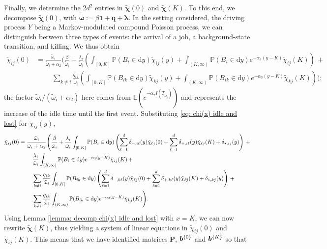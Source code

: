 \documentclass[reqno,12pt]{amsart}
\newcommand{\bs}{\boldsymbol}
\begin{document}
{Finally, we determine the $2d^2$ entries in $\tilde{\bs \chi}(0)$ and $\tilde{\bs \chi}(K)$. To this end, we decompose $\tilde{\bs \chi}(0)$, with $\tilde{\bs \omega} := \beta\bs{1} + \bs{q} + \bs{\lambda}$. 
In the setting considered, the driving process $Y$ being a Markov-modulated compound Poisson process, we can distinguish between three types of events: the arrival of a job,  a background-state transition, and killing. We thus obtain
\begin{align*}
    \tilde\chi_{ij}(0) &= \frac{\tilde\omega_i}{\tilde\omega_i+\alpha_2} \Bigg(\frac{\beta}{\tilde{\omega}_i}+\frac{\lambda_i}{\tilde{\omega}_i} \left(\int_{[0,K]}\mathbb{P}(B_i\in\mathrm{d}y)\tilde\chi_{ij}(y) + \int_{(K,\infty)}\mathbb{P}(B_i\in\mathrm{d}y)e^{-\alpha_3(y-K)}\tilde\chi_{ij}(K)\right)\,+\,\\
    &\:\:\:\:\:\:\quad\sum_{k\neq i}\frac{q_{ik}}{\tilde{\omega}_i} \left(\int_{[0,K]}\mathbb{P}(B_{ik}\in\mathrm{d}y)\tilde\chi_{kj}(y) + \int_{(K,\infty)}\mathbb{P}(B_{ik}\in\mathrm{d}y)e^{-\alpha_3(y-K)}\tilde\chi_{kj}(K)\right)\Bigg);
\end{align*}
the factor ${\tilde\omega_i}/({\tilde\omega_i+\alpha_2})$ here comes from $\mathbb{E}(e^{-\alpha_2 I(T_{\tilde\omega_i})})$ and represents the increase of the idle time until the first event.
Substituting \eqref{eq: chi(x) idle and lost} for $\tilde\chi_{ij}(y)$,
\begin{align}
    \tilde\chi_{ij}(0) &= \frac{\tilde\omega_i}{\tilde\omega_i+\alpha_2} \Bigg(\frac{\beta}{\tilde{\omega}_i}+\frac{\lambda_i}{\tilde{\omega}_i} \int_{[0,K]}\mathbb{P}(B_i\in\mathrm{d}y)\left(\sum_{\ell=1}^d\delta_{-, i\ell}(y)\tilde\chi_{\ell j}(0) + \sum_{\ell=1}^d\delta_{+, i\ell}(y)\tilde\chi_{\ell j}(K) + \delta_{\star,ij}(y)\right)\,+\,\notag\\ 
    &\quad\:\:\:\:\:\:\frac{\lambda_i}{\tilde{\omega}_i}  \int_{(K,\infty)}\mathbb{P}(B_i\in\mathrm{d}y)e^{-\alpha_3(y-K)}\tilde\chi_{ij}(K)\,+\,\notag\\
    &\quad\:\:\:\:\:\:\sum_{k\neq i}\frac{q_{ik}}{\tilde{\omega}_i} \int_{[0,K]}\mathbb{P}(B_{ik}\in\mathrm{d}y)\left(\sum_{\ell=1}^d\delta_{-, k\ell}(y)\tilde\chi_{\ell j}(0) + \sum_{\ell=1}^d\delta_{+, k\ell}(y)\tilde\chi_{\ell j}(K) + \delta_{\star,kj}(y)\right) \,+\,\notag\\
    &\quad\:\:\:\:\:\:\sum_{k\neq i}\frac{q_{ik}}{\tilde{\omega}_i} \int_{(K,\infty)}\mathbb{P}(B_{ik}\in\mathrm{d}y)e^{-\alpha_3(y-K)}\tilde\chi_{kj}(K)\Bigg).\notag
\end{align}
Using Lemma \ref{lemma: decomp chi(x) idle and lost} with $x=K$, we can now rewrite $\tilde{\bs \chi}(K)$, thus yielding a system of linear equations in $\tilde\chi_{ij}(0)$ and $\tilde\chi_{ij}(K)$. This means that we have identified matrices $\tilde{\bs P}$, ${{\smash{\tilde{\bs b}}}^{\{0\}}}$ and ${{\smash{\tilde{\bs b}}}^{\{K\}}}$ so that
}
\end{document}
